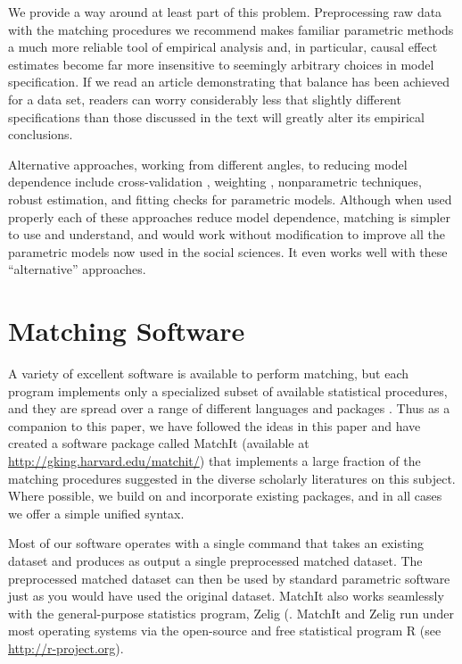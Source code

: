 \documentclass[11pt,titlepage]{article}
\begin{document}
We provide a way around at least part of this problem.  Preprocessing
raw data with the matching procedures we recommend makes familiar
parametric methods a much more reliable tool of empirical analysis
and, in particular, causal effect estimates become far more
insensitive to seemingly arbitrary choices in model specification.  If
we read an article demonstrating that balance has been achieved for a
data set, readers can worry considerably less that slightly different
specifications than those discussed in the text will greatly alter its
empirical conclusions.

Alternative approaches, working from different angles, to reducing
model dependence include cross-validation \citep{BlaSmi**}, weighting
\citep{Robins**; HirImbRub**}, nonparametric techniques, robust
estimation, and fitting checks for parametric models.  Although when
used properly each of these approaches reduce model dependence,
matching is simpler to use and understand, and would work without
modification to improve all the parametric models now used in the
social sciences.  It even works well with these ``alternative''
approaches.

\appendix
\section{Matching Software}\label{s:matchit}

A variety of excellent software is available to perform matching, but
each program implements only a specialized subset of available
statistical procedures, and they are spread over a range of different
languages and packages \citep{AbaDruLeb02,BecIch02, BerKos03,
  CumMcKWei03, Hansen05, LeuSia04,Parsons00,Parsons01,Sekhon04}.  Thus
as a companion to this paper, we have followed the ideas in this paper
and have created a software package called MatchIt (available at
\url{http://gking.harvard.edu/matchit/}) that implements a large
fraction of the matching procedures suggested in the diverse scholarly
literatures on this subject.  Where possible, we build on and
incorporate existing packages, and in all cases we offer a simple
unified syntax.

Most of our software operates with a single command that takes an
existing dataset and produces as output a single preprocessed matched
dataset.  The preprocessed matched dataset can then be used by
standard parametric software just as you would have used the original
dataset.  MatchIt also works seamlessly with the general-purpose
statistics program, Zelig (\citet{ImaKinLau04}.  MatchIt and Zelig run
under most operating systems via the open-source and free statistical
program R (see \url{http://r-project.org}).
\end{document}
